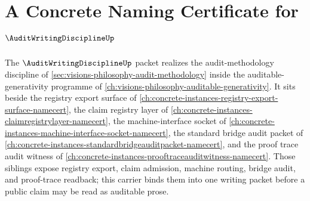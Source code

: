 \chapter{A Concrete Naming Certificate for $\AuditWritingDisciplineUp$}
\label{ch:concrete-instances-audit-writing-discipline-namecert}

The $\AuditWritingDisciplineUp$ packet realizes the audit-methodology discipline of \autoref{sec:visions-philosophy-audit-methodology} inside the auditable-generativity programme of \autoref{ch:visions-philosophy-auditable-generativity}. It sits beside the registry export surface of \autoref{ch:concrete-instances-registry-export-surface-namecert}, the claim registry layer of \autoref{ch:concrete-instances-claimregistrylayer-namecert}, the machine-interface socket of \autoref{ch:concrete-instances-machine-interface-socket-namecert}, the standard bridge audit packet of \autoref{ch:concrete-instances-standardbridgeauditpacket-namecert}, and the proof trace audit witness of \autoref{ch:concrete-instances-prooftraceauditwitness-namecert}. Those siblings expose registry export, claim admission, machine routing, bridge audit, and proof-trace readback; this carrier binds them into one writing packet before a public claim may be read as auditable prose.

